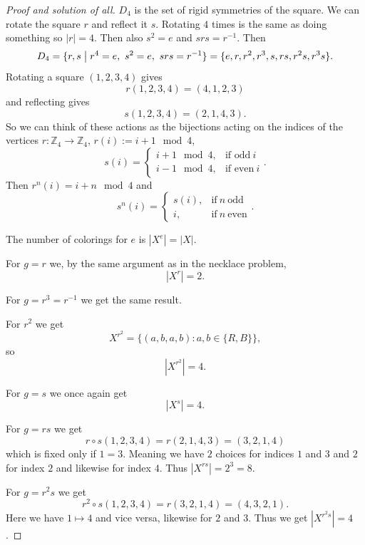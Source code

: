 \begin{proof}[Proof and solution of all]
    $D_4$ is the set of rigid symmetries of the square. 
    We can rotate the square $r$ and reflect it $s$. 
    Rotating $4$ times is the same as doing something so 
    $|r| = 4$. Then also $s^2 = e$ and $srs = r^{-1}$.
    Then 
    \[
        D_4 = \{r,s \bigm| r^4 = e, \ s^2 = e, \ srs = r^{-1}\}
        = 
        \{e, r,r^2,r^3,s,rs, r^2s, r^3s\}.
    \]
    Rotating a square $(1,2,3,4)$ gives 
    \[
        r(1,2,3,4) = (4,1,2,3)
    \]
    and reflecting gives 
    \[
        s(1,2,3,4) = (2,1,4,3). 
    \]
    So we can think of these actions as the bijections 
    acting on the indices of the vertices
    $r : \mathbb Z_4 \to \mathbb Z_4$, 
    $r(i) := i + 1 \mod 4$, 
    \[
        s(i) = 
        \begin{cases}
            i + 1 \mod 4, & \text{if odd}\ i \\ 
            i - 1 \mod 4, & \text{if even}\ i
        \end{cases}.
    \]
    Then $r^n(i) = i + n \mod 4$ and 
    \[
        s^n(i)
        = 
        \begin{cases}
            s(i), & \text{if} \ n \ \text{odd} \\ 
            i , & \text{if} \ n \ \text{even}
        \end{cases}.
    \]

    The number of colorings for $e$ is $|X^e| = |X|$. 

    For $g = r$ we, by the same argument as in the necklace problem,
    \[
        |X^r| = 2. 
    \]

    For $g = r^3 = r^{-1}$ we get the same result. 

    For $r^2$ we get 
    \[
        X^{r^2} = \{(a,b,a,b) : a,b \in \{R,B\}\},
    \]
    so 
    \[
        |X^{r^2}| = 4.
    \]

    For $g = s$ we once again get 
    \[
        |X^s| = 4.
    \]

    For $g = rs$ we get 
    \[
        r \circ s(1,2,3,4) = r(2,1,4,3) = 
        (3,2,1,4)
    \]
    which is fixed only if $1 = 3$. Meaning we have $2$ choices 
    for indices $1$ and $3$ and $2$ for index $2$ and likewise for 
    index $4$. Thus $|X^{rs}| = 2^3 = 8$.

    For $g = r^2s$ we get 
    \[
        r^2 \circ s (1,2,3,4) = r(3,2,1,4) = (4,3,2,1). 
    \]
    Here we have $1 \mapsto 4$ and vice versa, likewise for 
    $2$ and $3$. Thus we get $|X^{r^2s}| = 4$. 


\end{proof}
